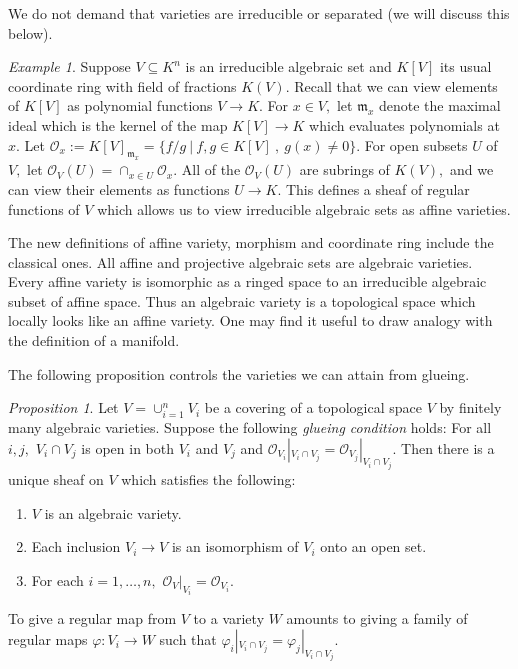 \documentclass[BSc]{usydthesis}
\numberwithin{equation}{chapter}
\theoremstyle{remark}
\newtheorem{Proposition}[equation]{Proposition}
\newtheorem{Example}[equation]{Example}
\begin{document}
We do not demand that varieties are irreducible or separated (we will discuss this below).
\begin{Example}
 Suppose $V\subseteq K^n$ is an irreducible algebraic set and $K[V]$ its usual coordinate ring with field of fractions $K(V).$ Recall that we can view elements of $K[V]$ as polynomial functions $V\to K.$ For $x\in V,$ let $\mathfrak{m}_x$ denote the maximal ideal which is the kernel of the map $K[V] \to K$ which evaluates polynomials at $x.$ Let $\mathcal{O}_x := K[V]_{ \mathfrak{m}_x} = \{ f/g \ | \ f,g\in K[V] \ , \ g(x)\neq 0 \}.$ For open subsets $U$ of $V,$ let $\mathcal{O}_V(U) = \cap_{x\in U} \mathcal{O}_x.$ All of the $\mathcal{O}_V(U)$ are subrings of $K(V),$ and we can view their elements as functions $U\to K.$ This defines a sheaf of regular functions of $V$ which allows us to view irreducible algebraic sets as affine varieties.
\end{Example}

The new definitions of affine variety, morphism and coordinate ring include the classical ones. All affine and projective algebraic sets are algebraic varieties. Every affine variety is isomorphic as a ringed space to an irreducible algebraic subset of affine space. Thus an algebraic variety is a topological space which locally looks like an affine variety. One may find it useful to draw analogy with the definition of a manifold. 

The following proposition controls the varieties we can attain from glueing.
\begin{Proposition}
 Let $V=\cup_{i=1}^n V_i$ be a covering of a topological space $V$ by finitely many algebraic varieties. Suppose the following {\em glueing condition} holds: For all $i,j,$ $V_i\cap V_j$ is open in both $V_i$ and $V_j$ and $\mathcal{O}_{V_i}|_{V_i\cap V_j}=\mathcal{O}_{V_j}|_{V_i\cap V_j}.$ Then there is a unique sheaf on $V$ which satisfies the following:
   \begin{enumerate}
    \item $V$ is an algebraic variety.
    \item Each inclusion $V_i\to V$ is an isomorphism of $V_i$ onto an open set.
    \item For each $i=1,\ldots, n,$ $\mathcal{O}_V|_{V_i} = \mathcal{O}_{V_i}.$
   \end{enumerate}
To give a regular map from $V$ to a variety $W$ amounts to giving a family of regular maps $\varphi:V_i\to W$ such that $\varphi_i|_{V_i\cap V_j}=\varphi_j|_{V_i\cap V_j}.$
\end{Proposition}
\end{document}
